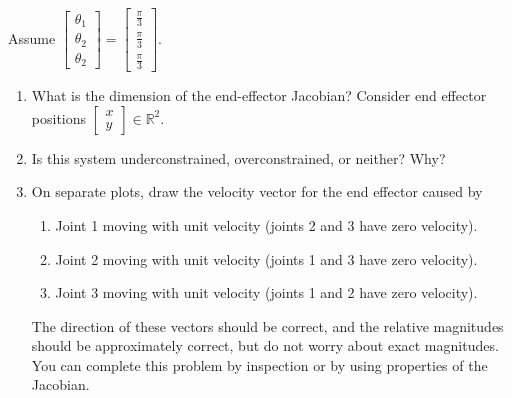 \documentclass{16384_doc}
\begin{document}
\begin{questions}
    Assume $\begin{bmatrix}
        \theta_1 \\ \theta_2 \\ \theta_2
    \end{bmatrix} = \begin{bmatrix}
        \frac\pi3 \\ \frac\pi3 \\ \frac\pi3
    \end{bmatrix}$.
    
     \begin{enumerate} [label=\alph*.]
        \item \text{[1 point]} What is the dimension of the end-effector Jacobian? Consider
        end effector positions $\begin{bmatrix}
            x \\ y
        \end{bmatrix} \in \mathbb{R}^2$. %
        \begin{tcolorbox}[height=3cm]
        \end{tcolorbox}
        
        \item \text{[1 point]} Is this system underconstrained, overconstrained, or neither?
        Why?
        \begin{tcolorbox}[height=3cm]
        \end{tcolorbox}
        
        \item \text{[6 points]} On separate plots, draw the velocity vector for the end effector
        caused by
        \begin{enumerate} [label=(\roman*)]
          \item Joint 1 moving with unit velocity (joints 2 and 3 have zero velocity).
          \item Joint 2 moving with unit velocity (joints 1 and 3 have zero velocity).
          \item Joint 3 moving with unit velocity (joints 1 and 2 have zero velocity).
        \end{enumerate}
        The direction of these vectors should be correct, and the relative
        magnitudes should be approximately correct, but do not worry about
        exact magnitudes.  You can complete this problem by inspection or by
        using properties of the Jacobian.
        \begin{tcolorbox}[height=3cm]
        \end{tcolorbox}
        

\end{enumerate}
\end{questions}
\end{document}
